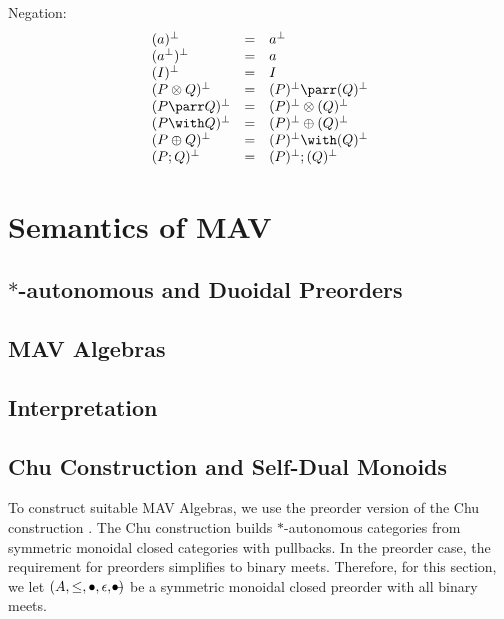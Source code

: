 \documentclass[twoside,11pt]{entics}
\begin{document}
Negation:
\begin{displaymath}
  \begin{array}{lcl}
    (a)^\perp           & = & a^\perp \\
    (a^\perp)^\perp     & = & a \\
    (I)^\perp           & = & I \\
    (P \otimes Q)^\perp & = & (P)^\perp \parr   (Q)^\perp \\
    (P \parr   Q)^\perp & = & (P)^\perp \otimes (Q)^\perp \\
    (P \with   Q)^\perp & = & (P)^\perp \oplus  (Q)^\perp \\
    (P \oplus  Q)^\perp & = & (P)^\perp \with   (Q)^\perp \\
    (P ; Q)^\perp       & = & (P)^\perp ; (Q)^\perp
  \end{array}
\end{displaymath}

\section{Semantics of MAV}

\subsection{$*$-autonomous and Duoidal Preorders}

\subsection{MAV Algebras}

\subsection{Interpretation}

\subsection{Chu Construction and Self-Dual Monoids}

\newcommand{\Chu}{\mathrm{Chu}}
\newcommand{\op}{\mathrm{op}}

To construct suitable MAV Algebras, we use the preorder version of the
Chu construction \cite{barr}. The Chu construction builds
$*$-autonomous categories from symmetric monoidal closed categories
with pullbacks. In the preorder case, the requirement for preorders
simplifies to binary meets. Therefore, for this section, we let
$(A, \leq, \bullet, \epsilon, -\kern-9pt\bullet)$ be a symmetric
monoidal closed preorder with all binary meets.
\end{document}
